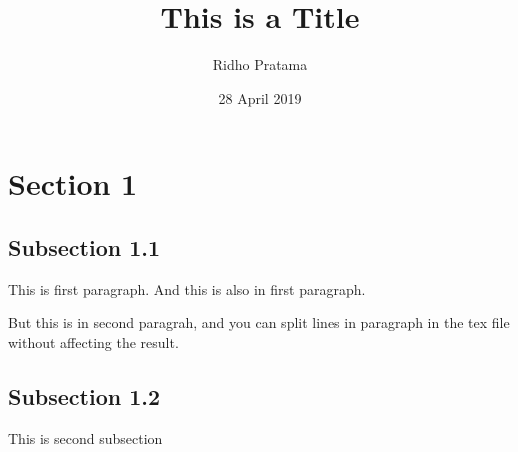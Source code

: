 \documentclass{article}
\title{This is a Title}
\author{Ridho Pratama}
\date{28 April 2019}
\begin{document}
\maketitle

\section{Section 1}
\subsection{Subsection 1.1}
This is first paragraph.
And this is also in first paragraph.

But this is in second paragrah, and you
can split lines in paragraph in the tex
file without affecting the result.

\subsection{Subsection 1.2}
This is second subsection
\end{document}
